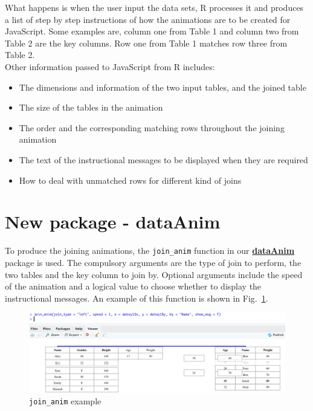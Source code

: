 What happens is when the user input the data sets, \textsf{R} processes it and produces a list of step by step instructions of how the animations are to be created for \textsf{JavaScript}. Some examples are, column one from Table 1 and column two from Table 2 are the key columns. Row one from Table 1 matches row three from Table 2. \\

Other information passed to JavaScript from R includes: 
\begin{itemize}
    \item The dimensions and information of the two input tables, and the joined table
    \item The size of the tables in the animation
    \item The order and the corresponding matching rows throughout the joining animation
    \item The text of the instructional messages to be displayed when they are required
    \item How to deal with unmatched rows for different kind of joins
\end{itemize}

\newpage 

\section{New package - dataAnim}
To produce the joining animations, the \texttt{join\_anim} function in our \href{https://github.com/chrk623/dataAnim}{\textbf{dataAnim}} package is used. The compulsory arguments are the type of join to perform, the two tables and the key column to join by. 
Optional arguments include the speed of the animation and a logical value to choose whether to display the instructional messages. An example of this function is shown in Fig.~\ref{fig:joinanim}.

\begin{figure}[H]
    \centering
    \includegraphics[scale = 0.8]{Masters-Thesis/img/joinanim.png}
    \caption{\texttt{join\_anim} example}
    \label{fig:joinanim}
\end{figure}

